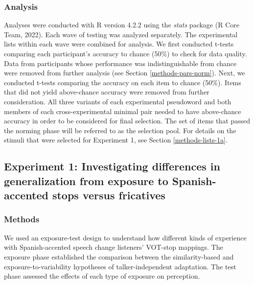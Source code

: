 \documentclass[
  12pt,
  twoside]{article}
\begin{document}
\hypertarget{methods-analysis-norm}{%
\subsubsection{Analysis}\label{methods-analysis-norm}}

Analyses were conducted with R version 4.2.2 using the \emph{stats} package (R Core Team, 2022).
Each wave of testing was analyzed separately.
The experimental lists within each wave were combined for analysis.
We first conducted t-tests comparing each participant's accuracy to chance (50\%) to check for data quality.
Data from participants whose performance was indistinguishable from chance were removed from further analysis (see Section \ref{methods-pars-norm}).
Next, we conducted t-tests comparing the accuracy on each item to chance (50\%).
Items that did not yield above-chance accuracy were removed from further consideration.
All three variants of each experimental pseudoword and both members of each cross-experimental minimal pair needed to have above-chance accuracy in order to be considered for final selection.
The set of items that passed the norming phase will be referred to as the selection pool.
For details on the stimuli that were selected for Experiment 1, see Section \ref{methods-lists-1a}.

\hypertarget{experiment-1-investigating-differences-in-generalization-from-exposure-to-spanish-accented-stops-versus-fricatives}{%
\subsection{Experiment 1: Investigating differences in generalization from exposure to Spanish-accented stops versus fricatives}\label{experiment-1-investigating-differences-in-generalization-from-exposure-to-spanish-accented-stops-versus-fricatives}}

\hypertarget{methods}{%
\subsubsection{Methods}\label{methods}}

We used an exposure-test design to understand how different kinds of experience with Spanish-accented speech change listeners' VOT-stop mappings.
The exposure phase established the comparison between the similarity-based and exposure-to-variability hypotheses of talker-independent adaptation.
The test phase assessed the effects of each type of exposure on perception.
\end{document}
